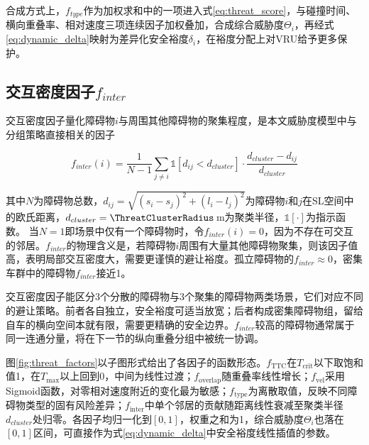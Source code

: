 合成方式上，$f_{type}$作为加权求和中的一项进入式\eqref{eq:threat_score}，与碰撞时间、横向重叠率、相对速度三项连续因子加权叠加，合成综合威胁度$\Theta_i$，再经式\eqref{eq:dynamic_delta}映射为差异化安全裕度$\delta_i$，在裕度分配上对VRU给予更多保护。

\subsection{交互密度因子$f_{inter}$}
交互密度因子量化障碍物$i$与周围其他障碍物的聚集程度，是本文威胁度模型中与分组策略直接相关的因子

\begin{equation}
    f_{inter}(i) = \frac{1}{N-1} \sum_{j \neq i} \mathbb{1}\!\left[d_{ij} < d_{cluster}\right] \cdot \frac{d_{cluster} - d_{ij}}{d_{cluster}}
    \label{eq:f_inter}
\end{equation}

其中$N$为障碍物总数，$d_{ij} = \sqrt{(s_i - s_j)^2 + (l_i - l_j)^2}$为障碍物$i$和$j$在SL空间中的欧氏距离，$d_{cluster} = \ThreatClusterRadius$\,m为聚类半径，$\mathbb{1}[\cdot]$为指示函数。
当$N=1$即场景中仅有一个障碍物时，令$f_{inter}(i) = 0$，因为不存在可交互的邻居。$f_{inter}$的物理含义是，若障碍物$i$周围有大量其他障碍物聚集，则该因子值高，表明局部交互密度大，需要更谨慎的避让裕度。孤立障碍物的$f_{inter} \approx 0$，密集车群中的障碍物$f_{inter}$接近1。

交互密度因子能区分3个分散的障碍物与3个聚集的障碍物两类场景，它们对应不同的避让策略。前者各自独立，安全裕度可适当放宽；后者构成密集障碍物组，留给自车的横向空间本就有限，需要更精确的安全边界。$f_{inter}$较高的障碍物通常属于同一连通分量，将在下一节的纵向重叠分组中被统一协调。

图\ref{fig:threat_factors}以子图形式给出了各因子的函数形态。$f_\text{TTC}$在$T_\text{crit}$以下取饱和值1，在$T_\text{max}$以上回到0，中间为线性过渡；$f_\text{overlap}$随重叠率线性增长；$f_\text{vel}$采用Sigmoid函数，对零相对速度附近的变化最为敏感；$f_\text{type}$为离散取值，反映不同障碍物类型的固有风险差异；$f_\text{inter}$中单个邻居的贡献随距离线性衰减至聚类半径$d_{cluster}$处归零。各因子均归一化到$[0,1]$，权重之和为1，综合威胁度$\Theta_i$也落在$[0,1]$区间，可直接作为式\eqref{eq:dynamic_delta}中安全裕度线性插值的参数。

